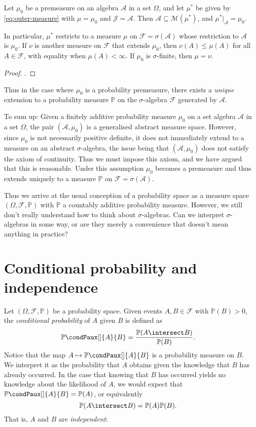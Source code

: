 \documentclass[article, a4paper, 11pt, oneside]{memoir}
\numberwithin{equation}{chapter}
\newcommand{\calF}{\mathcal{F}}
\newcommand{\calA}{\mathcal{A}}
\newcommand{\calJ}{\mathcal{J}}
\newcommand{\calM}{\mathcal{M}}
\renewcommand{\P}{\mathbb{P}}
\newcommand{\condP}[3][]{{\P\condPaux[#1]{#2}{#3}}}
\begin{document}
\begin{theorem}
    Let $\mu_0$ be a premeasure on an algebra $\calA$ in a set $\Omega$, and let $\mu^*$ be given by \cref{eq:outer-measure} with $\mu = \mu_0$ and $\calJ = \calA$. Then $\calA \subseteq \calM(\mu^*)$, and $\mu^*|_\calA = \mu_0$.

    In particular, $\mu^*$ restricts to a measure $\mu$ on $\calF = \sigma(\calA)$ whose restriction to $\calA$ is $\mu_0$. If $\nu$ is another measure on $\calF$ that extends $\mu_0$, then $\nu(A) \leq \mu(A)$ for all $A \in \calF$, with equality when $\mu(A) < \infty$. If $\mu_0$ is $\sigma$-finite, then $\mu = \nu$.
\end{theorem}

\begin{proof}
    \textcite[Theorem~1.14]{folland2007}.
\end{proof}
%
Thus in the case where $\mu_0$ is a probability premeasure, there exists a \emph{unique} extension to a probability measure $\P$ on the $\sigma$-algebra $\calF$ generated by $\calA$.

To sum up: Given a finitely additive probability measure $\mu_0$ on a set algebra $\calA$ in a set $\Omega$, the pair $(\calA,\mu_0)$ is a generalised abstract measure space. However, since $\mu_0$ is not necessarily positive definite, it does not immediately extend to a measure on an abstract $\sigma$-algebra, the issue being that $(\calA,\mu_0)$ does not satisfy the axiom of continuity. Thus we must impose this axiom, and we have argued that this is reasonable. Under this assumption $\mu_0$ becomes a premeasure and thus extends uniquely to a measure $\P$ on $\calF = \sigma(\calA)$.

Thus we arrive at the usual conception of a probability space as a measure space $(\Omega,\calF,\P)$ with $\P$ a countably additive probability measure. However, we still don't really understand how to think about $\sigma$-algebras. Can we interpret $\sigma$-algebras in some way, or are they merely a convenience that doesn't mean anything in practice?


\section{Conditional probability and independence}
\label{sec:independence}

Let $(\Omega,\calF,\P)$ be a probability space. Given events $A,B \in \calF$ with $\P(B) > 0$, the \emph{conditional probability} of $A$ given $B$ is defined as
%
\begin{equation*}
    \condP{A}{B}
        = \frac{ \P(A \intersect B) }{ \P(B) }.
\end{equation*}
%
Notice that the map $A \mapsto \condP{A}{B}$ is a probability measure on $B$. We interpret it as the probability that $A$ obtains given the knowledge that $B$ has already occurred. In the case that knowing that $B$ has occurred yields no knowledge about the likelihood of $A$, we would expect that $\condP{A}{B} = \P(A)$, or equivalently
%
\begin{equation*}
    \P(A \intersect B) = \P(A) \P(B).
\end{equation*}
%
That is, $A$ and $B$ are \emph{independent}:
\end{document}
